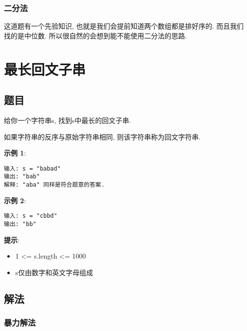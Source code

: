 \documentclass[oneside]{ctexbook}
\begin{document}
\subsection{二分法}

这道题有一个先验知识, 也就是我们会提前知道两个数组都是排好序的. 而且我们找的是中位数. 所以很自然的会想到能不能使用二分法的思路.



\chapter{最长回文子串}

\section{题目}

给你一个字符串s, 找到s中最长的回文子串.

如果字符串的反序与原始字符串相同, 则该字符串称为回文字符串.

\textbf{示例 1}:

\begin{verbatim}
输入: s = "babad"
输出: "bab"
解释: "aba" 同样是符合题意的答案.
\end{verbatim}

\textbf{示例 2}:

\begin{verbatim}
输入: s = "cbbd"
输出: "bb"
\end{verbatim}

\textbf{提示}:

\begin{itemize}
    \item 1 <= s.length <= 1000
    \item s仅由数字和英文字母组成
\end{itemize}

\section{解法}

\subsection{暴力解法}
\end{document}
